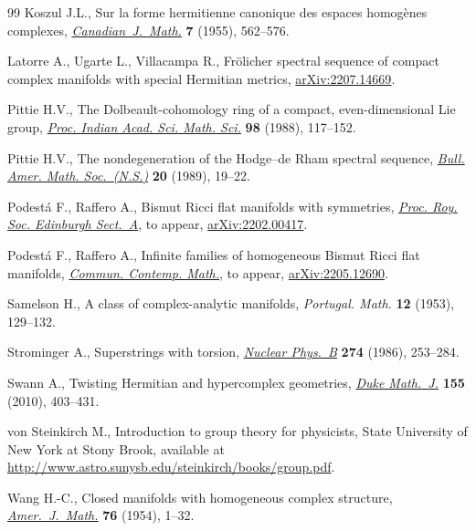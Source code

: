 \documentclass[pdftex]{sigma}
\numberwithin{equation}{section}
\begin{document}
\begin{thebibliography}{99}
Koszul J.L., Sur la forme hermitienne canonique des espaces homog\`enes
 complexes, \href{https://doi.org/10.4153/CJM-1955-061-3}{\textit{Canadian~J.~Math.}} \textbf{7} (1955), 562--576.

Latorre A., Ugarte L., Villacampa R., Fr\"olicher spectral sequence of compact
 complex manifolds with special {H}ermitian metrics, \href{https://arxiv.org/abs/2207.14669}{arXiv:2207.14669}.

Pittie H.V., The {D}olbeault-cohomology ring of a compact, even-dimensional
 {L}ie group, \href{https://doi.org/10.1007/BF02863632}{\textit{Proc. Indian Acad. Sci. Math. Sci.}} \textbf{98} (1988),
 117--152.

Pittie H.V., The nondegeneration of the {H}odge--de {R}ham spectral sequence,
 \href{https://doi.org/10.1090/S0273-0979-1989-15683-8}{\textit{Bull. Amer. Math. Soc.~(N.S.)}} \textbf{20} (1989), 19--22.

Podest\'a F., Raffero A., Bismut {R}icci flat manifolds with symmetries,
 \href{https://doi.org/10.1017/prm.2022.49}{\textit{Proc. Roy. Soc. Edinburgh Sect.~A}}, {t}o appear, \href{https://arxiv.org/abs/2202.00417}{arXiv:2202.00417}.

Podest\'a F., Raffero A., Infinite families of homogeneous {B}ismut {R}icci
 flat manifolds, \href{https://doi.org/10.1142/S0219199722500754}{\textit{Commun. Contemp. Math.}}, {t}o appear,
 \href{https://arxiv.org/abs/2205.12690}{arXiv:2205.12690}.

Samelson H., A class of complex-analytic manifolds, \textit{Portugal. Math.}
 \textbf{12} (1953), 129--132.

Strominger A., Superstrings with torsion, \href{https://doi.org/10.1016/0550-3213(86)90286-5}{\textit{Nuclear Phys.~B}} \textbf{274}
 (1986), 253--284.

Swann A., Twisting {H}ermitian and hypercomplex geometries, \href{https://doi.org/10.1215/00127094-2010-059}{\textit{Duke
 Math.~J.}} \textbf{155} (2010), 403--431.

von Steinkirch M., Introduction to group theory for physicists, {S}tate
 University of New York at Stony Brook, available at
 \url{http://www.astro.sunysb.edu/steinkirch/books/group.pdf}.

Wang H.-C., Closed manifolds with homogeneous complex structure,
 \href{https://doi.org/10.2307/2372397}{\textit{Amer.~J.~Math.}} \textbf{76} (1954), 1--32.

\end{thebibliography}\LastPageEnding
\end{document}
